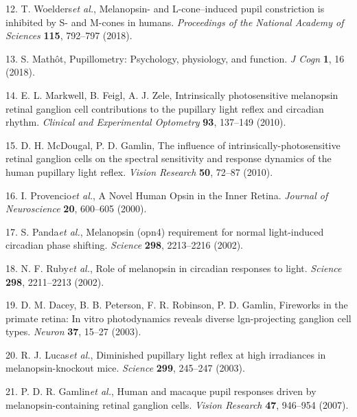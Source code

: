 \documentclass[
]{article}
\begin{document}
\leavevmode\hypertarget{ref-Woelders2018}{}%
12. T. Woelders\emph{et al.}, Melanopsin- and L-cone--induced pupil constriction is inhibited by S- and M-cones in humans. \emph{Proceedings of the National Academy of Sciences} \textbf{115}, 792--797 (2018).

\leavevmode\hypertarget{ref-Mathot2018}{}%
13. S. Mathôt, Pupillometry: Psychology, physiology, and function. \emph{J Cogn} \textbf{1}, 16 (2018).

\leavevmode\hypertarget{ref-Markwell2010}{}%
14. E. L. Markwell, B. Feigl, A. J. Zele, Intrinsically photosensitive melanopsin retinal ganglion cell contributions to the pupillary light reflex and circadian rhythm. \emph{Clinical and Experimental Optometry} \textbf{93}, 137--149 (2010).

\leavevmode\hypertarget{ref-McDougal2010}{}%
15. D. H. McDougal, P. D. Gamlin, The influence of intrinsically-photosensitive retinal ganglion cells on the spectral sensitivity and response dynamics of the human pupillary light reflex. \emph{Vision Research} \textbf{50}, 72--87 (2010).

\leavevmode\hypertarget{ref-Provencio2000}{}%
16. I. Provencio\emph{et al.}, A Novel Human Opsin in the Inner Retina. \emph{Journal of Neuroscience} \textbf{20}, 600--605 (2000).

\leavevmode\hypertarget{ref-Panda2002}{}%
17. S. Panda\emph{et al.}, Melanopsin (opn4) requirement for normal light-induced circadian phase shifting. \emph{Science} \textbf{298}, 2213--2216 (2002).

\leavevmode\hypertarget{ref-Ruby2002}{}%
18. N. F. Ruby\emph{et al.}, Role of melanopsin in circadian responses to light. \emph{Science} \textbf{298}, 2211--2213 (2002).

\leavevmode\hypertarget{ref-Dacey2003}{}%
19. D. M. Dacey, B. B. Peterson, F. R. Robinson, P. D. Gamlin, Fireworks in the primate retina: In vitro photodynamics reveals diverse lgn-projecting ganglion cell types. \emph{Neuron} \textbf{37}, 15--27 (2003).

\leavevmode\hypertarget{ref-Lucas2003}{}%
20. R. J. Lucas\emph{et al.}, Diminished pupillary light reflex at high irradiances in melanopsin-knockout mice. \emph{Science} \textbf{299}, 245--247 (2003).

\leavevmode\hypertarget{ref-Gamlin2007}{}%
21. P. D. R. Gamlin\emph{et al.}, Human and macaque pupil responses driven by melanopsin-containing retinal ganglion cells. \emph{Vision Research} \textbf{47}, 946--954 (2007).
\end{document}
